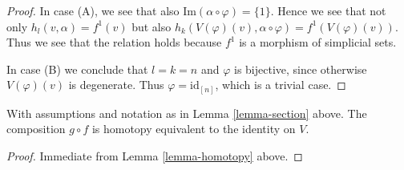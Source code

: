 \begin{proof}
\medskip\noindent
In case (A), we see that also $\text{Im}(\alpha \circ \varphi) = \{1\}$.
Hence we see that not only $h_l(v, \alpha) = f^1(v)$ but also
$h_k(V(\varphi)(v), \alpha \circ \varphi) = f^1(V(\varphi)(v))$.
Thus we see that the relation holds because $f^1$ is a morphism
of simplicial sets.

\medskip\noindent
In case (B) we conclude that $l = k = n$ and
$\varphi$ is bijective, since otherwise $V(\varphi)(v)$
is degenerate. Thus $\varphi = \text{id}_{[n]}$, which is a trivial case.
\end{proof}

\begin{lemma}
\label{lemma-equiv}
With assumptions and notation as in Lemma \ref{lemma-section}
above. The composition $g \circ f$ is homotopy equivalent
to the identity on $V$.
\end{lemma}

\begin{proof}
Immediate from Lemma \ref{lemma-homotopy} above.
\end{proof}






























